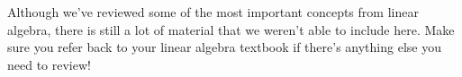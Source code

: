 \documentclass{ximera}
\begin{document}
Although we've reviewed some of the most important concepts from linear algebra, there is still a lot of material that we weren't able to include here. Make sure you refer back to your linear algebra textbook if there's anything else you need to review!
\end{document}
